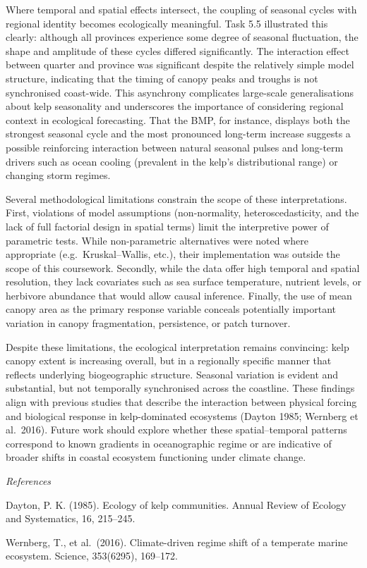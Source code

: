 \documentclass[
  british,
  10pt,
]{article}
\begin{document}
Where temporal and spatial effects intersect, the coupling of seasonal
cycles with regional identity becomes ecologically meaningful. Task 5.5
illustrated this clearly: although all provinces experience some degree
of seasonal fluctuation, the shape and amplitude of these cycles
differed significantly. The interaction effect between quarter and
province was significant despite the relatively simple model structure,
indicating that the timing of canopy peaks and troughs is not
synchronised coast-wide. This asynchrony complicates large-scale
generalisations about kelp seasonality and underscores the importance of
considering regional context in ecological forecasting. That the BMP,
for instance, displays both the strongest seasonal cycle and the most
pronounced long-term increase suggests a possible reinforcing
interaction between natural seasonal pulses and long-term drivers such
as ocean cooling (prevalent in the kelp's distributional range) or
changing storm regimes.

Several methodological limitations constrain the scope of these
interpretations. First, violations of model assumptions (non-normality,
heteroscedasticity, and the lack of full factorial design in spatial
terms) limit the interpretive power of parametric tests. While
non-parametric alternatives were noted where appropriate
(e.g.~Kruskal--Wallis, etc.), their implementation was outside the scope
of this coursework. Secondly, while the data offer high temporal and
spatial resolution, they lack covariates such as sea surface
temperature, nutrient levels, or herbivore abundance that would allow
causal inference. Finally, the use of mean canopy area as the primary
response variable conceals potentially important variation in canopy
fragmentation, persistence, or patch turnover.

Despite these limitations, the ecological interpretation remains
convincing: kelp canopy extent is increasing overall, but in a
regionally specific manner that reflects underlying biogeographic
structure. Seasonal variation is evident and substantial, but not
temporally synchronised across the coastline. These findings align with
previous studies that describe the interaction between physical forcing
and biological response in kelp-dominated ecosystems (Dayton 1985;
Wernberg et al.~2016). Future work should explore whether these
spatial--temporal patterns correspond to known gradients in
oceanographic regime or are indicative of broader shifts in coastal
ecosystem functioning under climate change.

\emph{References}

Dayton, P. K. (1985). Ecology of kelp communities. Annual Review of
Ecology and Systematics, 16, 215--245.

Wernberg, T., et al.~(2016). Climate-driven regime shift of a temperate
marine ecosystem. Science, 353(6295), 169--172.
\end{document}

